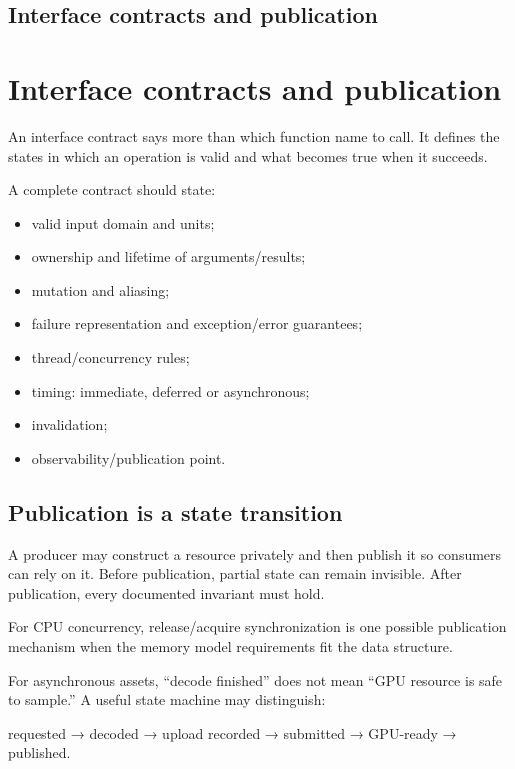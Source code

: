 \hypertarget{appendix-fdae7ff0a23f}{}
\section*{Interface contracts and publication}
\chapter{Interface contracts and publication}\label{appendix-fdae7ff0a23f-interface-contracts-and-publication}

An interface contract says more than which function name to call. It defines the states in which an operation is valid and what becomes true when it succeeds.

A complete contract should state:

\begin{itemize}
\tightlist
\item
  valid input domain and units;
\item
  ownership and lifetime of arguments/results;
\item
  mutation and aliasing;
\item
  failure representation and exception/error guarantees;
\item
  thread/concurrency rules;
\item
  timing: immediate, deferred or asynchronous;
\item
  invalidation;
\item
  observability/publication point.
\end{itemize}

\section{Publication is a state transition}\label{appendix-fdae7ff0a23f-publication-is-a-state-transition}

A producer may construct a resource privately and then publish it so consumers can rely on it. Before publication, partial state can remain invisible. After publication, every documented invariant must hold.

For CPU concurrency, release/acquire synchronization is one possible publication mechanism when the memory model requirements fit the data structure.

For asynchronous assets, ``decode finished'' does not mean ``GPU resource is safe to sample.'' A useful state machine may distinguish:

requested → decoded → upload recorded → submitted → GPU-ready → published.


